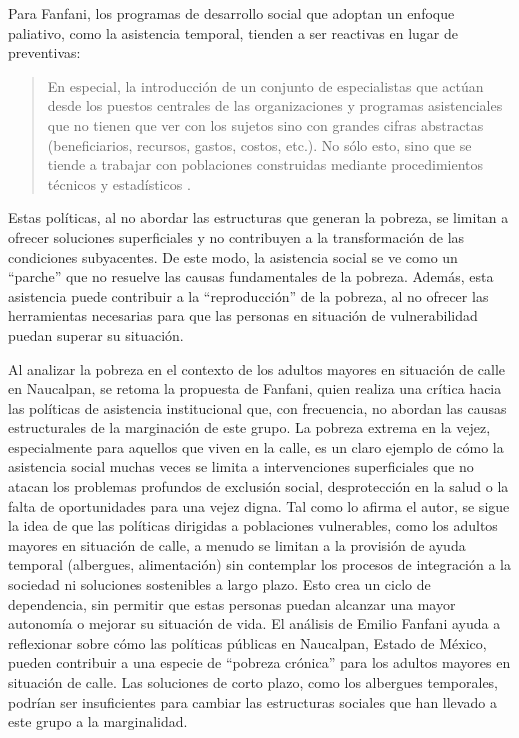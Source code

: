 \documentclass[
  spanish,
  11pt,
  a4paper,
]{scrbook}
\begin{document}
Para Fanfani, los programas de desarrollo social que adoptan un enfoque
paliativo, como la asistencia temporal, tienden a ser reactivas en lugar
de preventivas:

\begin{quote}
En especial, la introducción de un conjunto de especialistas que actúan
desde los puestos centrales de las organizaciones y programas
asistenciales que no tienen que ver con los sujetos sino con grandes
cifras abstractas (beneficiarios, recursos, gastos, costos, etc.). No
sólo esto, sino que se tiende a trabajar con poblaciones construidas
mediante procedimientos técnicos y estadísticos
\autocite[20]{TentiFanfani1989}.
\end{quote}

Estas políticas, al no abordar las estructuras que generan la pobreza,
se limitan a ofrecer soluciones superficiales y no contribuyen a la
transformación de las condiciones subyacentes. De este modo, la
asistencia social se ve como un ``parche'' que no resuelve las causas
fundamentales de la pobreza. Además, esta asistencia puede contribuir a
la ``reproducción'' de la pobreza, al no ofrecer las herramientas
necesarias para que las personas en situación de vulnerabilidad puedan
superar su situación.

Al analizar la pobreza en el contexto de los adultos mayores en
situación de calle en Naucalpan, se retoma la propuesta de Fanfani,
quien realiza una crítica hacia las políticas de asistencia
institucional que, con frecuencia, no abordan las causas estructurales
de la marginación de este grupo. La pobreza extrema en la vejez,
especialmente para aquellos que viven en la calle, es un claro ejemplo
de cómo la asistencia social muchas veces se limita a intervenciones
superficiales que no atacan los problemas profundos de exclusión social,
desprotección en la salud o la falta de oportunidades para una vejez
digna. Tal como lo afirma el autor, se sigue la idea de que las
políticas dirigidas a poblaciones vulnerables, como los adultos mayores
en situación de calle, a menudo se limitan a la provisión de ayuda
temporal (albergues, alimentación) sin contemplar los procesos de
integración a la sociedad ni soluciones sostenibles a largo plazo. Esto
crea un ciclo de dependencia, sin permitir que estas personas puedan
alcanzar una mayor autonomía o mejorar su situación de vida. El análisis
de Emilio Fanfani ayuda a reflexionar sobre cómo las políticas públicas
en Naucalpan, Estado de México, pueden contribuir a una especie de
``pobreza crónica'' para los adultos mayores en situación de calle. Las
soluciones de corto plazo, como los albergues temporales, podrían ser
insuficientes para cambiar las estructuras sociales que han llevado a
este grupo a la marginalidad.
\end{document}

